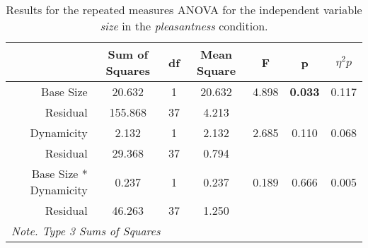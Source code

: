 \begin{table*}[ht]
    \centering
    \caption{Results for the repeated measures ANOVA for the independent variable \textit{size} in the \textit{pleasantness} condition.}
    \begin{tabular}{r|cccccc}
    \toprule
                                  & \textbf{Sum of Squares} & \textbf{df} & \textbf{Mean Square} & \textbf{F} & \textbf{p} & \textbf{$\eta^2p$} \\
    \midrule
    Base Size                     & 20.632                  & 1           & 20.632              & 4.898       & \textbf{0.033}      & 0.117              \\
    Residual                      & 155.868                 & 37          & 4.213               &             &                     &                    \\
    Dynamicity                    & 2.132                   & 1           & 2.132               & 2.685       & 0.110               & 0.068              \\
    Residual                      & 29.368                  & 37          & 0.794               &             &                     &                    \\
    Base Size * Dynamicity        & 0.237                   & 1           & 0.237               & 0.189       & 0.666               & 0.005              \\
    Residual                      & 46.263                  & 37          & 1.250               &             &                     &                    \\
    \bottomrule
    \multicolumn{7}{l}{\textit{Note. Type 3 Sums of Squares}}                                                                                                                                                                                                  
    \end{tabular}
\end{table*}

